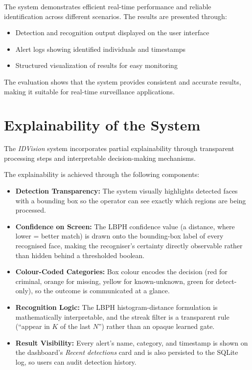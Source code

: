 \documentclass[11pt]{report}
\begin{document}
The system demonstrates efficient real-time performance and reliable identification across different scenarios. The results are presented through:

\begin{itemize}
    \item Detection and recognition output displayed on the user interface
    \item Alert logs showing identified individuals and timestamps
    \item Structured visualization of results for easy monitoring
\end{itemize}

The evaluation shows that the system provides consistent and accurate results, making it suitable for real-time surveillance applications.

\section{Explainability of the System}

The \textit{IDVision} system incorporates partial explainability through transparent processing steps and interpretable decision-making mechanisms.

The explainability is achieved through the following components:

\begin{itemize}
    \item \textbf{Detection Transparency:} The system visually highlights detected faces with a bounding box so the operator can see exactly which regions are being processed.

    \item \textbf{Confidence on Screen:} The LBPH confidence value (a distance, where lower = better match) is drawn onto the bounding-box label of every recognised face, making the recogniser's certainty directly observable rather than hidden behind a thresholded boolean.

    \item \textbf{Colour-Coded Categories:} Box colour encodes the decision (red for criminal, orange for missing, yellow for known-unknown, green for detect-only), so the outcome is communicated at a glance.

    \item \textbf{Recognition Logic:} The LBPH histogram-distance formulation is mathematically interpretable, and the streak filter is a transparent rule (``appear in $K$ of the last $N$'') rather than an opaque learned gate.

    \item \textbf{Result Visibility:} Every alert's name, category, and timestamp is shown on the dashboard's \emph{Recent detections} card and is also persisted to the SQLite log, so users can audit detection history.
\end{itemize}
\end{document}
